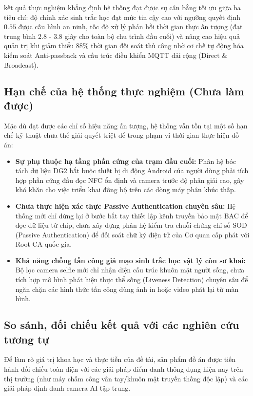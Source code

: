 \documentclass[../DoAn.tex]{subfiles}
\begin{document}
kết quả thực nghiệm khẳng định hệ thống đạt được sự cân bằng tối ưu giữa ba tiêu chí: độ chính xác sinh trắc học đạt mức tin cậy cao với ngưỡng quyết định $0.55$ được cấu hình an ninh, tốc độ xử lý phản hồi thời gian thực ấn tượng (đạt trung bình 2.8 - 3.8 giây cho toàn bộ chu trình đầu cuối) và nâng cao hiệu quả quản trị khi giảm thiểu 88\% thời gian đối soát thủ công nhờ cơ chế tự động hóa kiểm soát Anti-passback và cấu trúc điều khiển MQTT dải rộng (Direct & Broadcast).

\subsection{Hạn chế của hệ thống thực nghiệm (Chưa làm được)}
Mặc dù đạt được các chỉ số hiệu năng ấn tượng, hệ thống vẫn tồn tại một số hạn chế kỹ thuật chưa thể giải quyết triệt để trong phạm vi thời gian thực hiện đồ án:
\begin{itemize}
    \item \textbf{Sự phụ thuộc hạ tầng phần cứng của trạm đầu cuối:} Phân hệ bóc tách dữ liệu DG2 bắt buộc thiết bị di động Android của người dùng phải tích hợp phần cứng đầu đọc NFC ổn định và camera trước độ phân giải cao, gây khó khăn cho việc triển khai đồng bộ trên các dòng máy phân khúc thấp.
    \item \textbf{Chưa thực hiện xác thực Passive Authentication chuyên sâu:} Hệ thống mới chỉ dừng lại ở bước bắt tay thiết lập kênh truyền bảo mật BAC để đọc dữ liệu từ chip, chưa xây dựng phân hệ kiểm tra chuỗi chứng chỉ số SOD (Passive Authentication) để đối soát chữ ký điện tử của Cơ quan cấp phát với Root CA quốc gia.
    \item \textbf{Khả năng chống tấn công giả mạo sinh trắc học vật lý còn sơ khai:} Bộ lọc camera selfie mới chỉ nhận diện cấu trúc khuôn mặt người sống, chưa tích hợp mô hình phát hiện thực thể sống (Liveness Detection) chuyên sâu để ngăn chặn các hình thức tấn công dùng ảnh in hoặc video phát lại từ màn hình.
\end{itemize}

\subsection{So sánh, đối chiếu kết quả với các nghiên cứu tương tự}
Để làm rõ giá trị khoa học và thực tiễn của đề tài, sản phẩm đồ án được tiến hành đối chiếu toàn diện với các giải pháp điểm danh thông dụng hiện nay trên thị trường (như máy chấm công vân tay/khuôn mặt truyền thống độc lập) và các giải pháp định danh camera AI tập trung.
\end{document}
